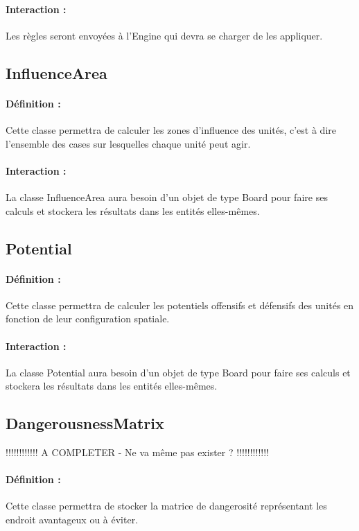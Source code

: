			\paragraph{Interaction :}
			Les règles seront envoyées à l'Engine qui devra se charger de les appliquer.

		\subsection*{InfluenceArea}

			\paragraph{Définition :}
			Cette classe permettra de calculer les zones d'influence des unités, c'est à dire l'ensemble des cases sur lesquelles 
			chaque unité peut agir.
			\paragraph{Interaction :}
			La classe InfluenceArea aura besoin d'un objet de type Board pour faire ses calculs et stockera les résultats dans 
			les entités elles-mêmes.

		\subsection*{Potential}

			\paragraph{Définition :}
			Cette classe permettra de calculer les potentiels offensifs et défensifs des unités en fonction de leur configuration spatiale.
			\paragraph{Interaction :}
			La classe Potential aura besoin d'un objet de type Board pour faire ses calculs et stockera les résultats dans les 
			entités elles-mêmes.

		\subsection*{DangerousnessMatrix}

			!!!!!!!!!!!! A COMPLETER - Ne va même pas exister ? !!!!!!!!!!!!
			\paragraph{Définition :}
			Cette classe permettra de stocker la matrice de dangerosité représentant les endroit avantageux ou à éviter.
